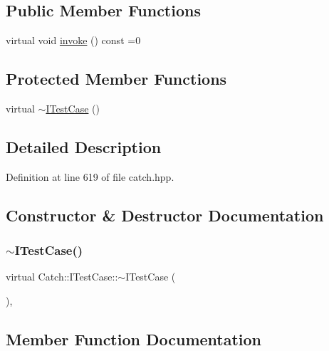 \subsection*{Public Member Functions}
\begin{DoxyCompactItemize}
\item 
virtual void \hyperlink{struct_catch_1_1_i_test_case_a678825e62e7c17297621cfeb65588c34}{invoke} () const =0
\end{DoxyCompactItemize}
\subsection*{Protected Member Functions}
\begin{DoxyCompactItemize}
\item 
virtual \hyperlink{struct_catch_1_1_i_test_case_add7b9bec455ac1b007c17df82144310e}{$\sim$\+I\+Test\+Case} ()
\end{DoxyCompactItemize}


\subsection{Detailed Description}


Definition at line 619 of file catch.\+hpp.



\subsection{Constructor \& Destructor Documentation}
\hypertarget{struct_catch_1_1_i_test_case_add7b9bec455ac1b007c17df82144310e}{}\label{struct_catch_1_1_i_test_case_add7b9bec455ac1b007c17df82144310e} 
\subsubsection{\texorpdfstring{$\sim$\+I\+Test\+Case()}{~ITestCase()}}
{\footnotesize\ttfamily virtual Catch\+::\+I\+Test\+Case\+::$\sim$\+I\+Test\+Case (\begin{DoxyParamCaption}{ }\end{DoxyParamCaption})\hspace{0.3cm}{\ttfamily [protected]}, {\ttfamily [virtual]}}



\subsection{Member Function Documentation}
\hypertarget{struct_catch_1_1_i_test_case_a678825e62e7c17297621cfeb65588c34}{}\label{struct_catch_1_1_i_test_case_a678825e62e7c17297621cfeb65588c34} 
